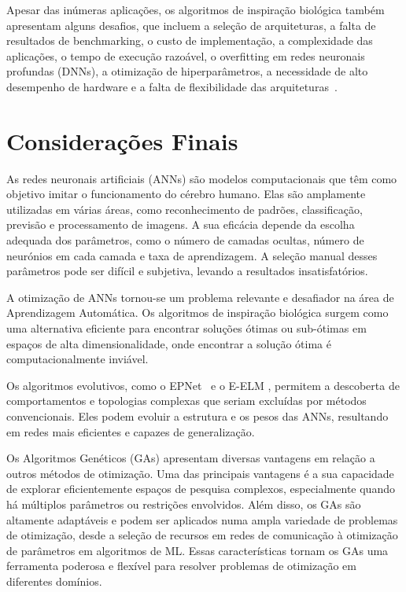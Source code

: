 \documentclass[conference]{IEEEtran}
\begin{document}
Apesar das inúmeras aplicações, os algoritmos de inspiração biológica também apresentam alguns desafios, que incluem a seleção de arquiteturas, a falta de resultados de benchmarking, o custo de implementação, a complexidade das aplicações, o tempo de execução razoável, o overfitting em redes neuronais profundas (DNNs), a otimização de hiperparâmetros, a necessidade de alto desempenho de hardware e a falta de flexibilidade das arquiteturas~\cite{Darwish2020ALearning, Mishra2023AAlgorithms}.

\section{Considerações Finais}

As redes neuronais artificiais (ANNs) são modelos computacionais que têm como objetivo imitar o funcionamento do cérebro humano. Elas são amplamente utilizadas em várias áreas, como reconhecimento de padrões, classificação, previsão e processamento de imagens. A sua eficácia depende da escolha adequada dos parâmetros, como o número de camadas ocultas, número de neurónios em cada camada e taxa de aprendizagem. A seleção manual desses parâmetros pode ser difícil e subjetiva, levando a resultados insatisfatórios.

A otimização de ANNs tornou-se um problema relevante e desafiador na área de Aprendizagem Automática. Os algoritmos de inspiração biológica surgem como uma alternativa eficiente para encontrar soluções ótimas ou sub-ótimas em espaços de alta dimensionalidade, onde encontrar a solução ótima é computacionalmente inviável.

Os algoritmos evolutivos, como o EPNet~\cite{Yao1997ANetworks} e o E-ELM \cite{Zhu2005EvolutionaryMachine}, permitem a descoberta de comportamentos e topologias complexas que seriam excluídas por métodos convencionais. Eles podem evoluir a estrutura e os pesos das ANNs, resultando em redes mais eficientes e capazes de generalização.

Os Algoritmos Genéticos (GAs) apresentam diversas vantagens em relação a outros métodos de otimização. Uma das principais vantagens é a sua capacidade de explorar eficientemente espaços de pesquisa complexos, especialmente quando há múltiplos parâmetros ou restrições envolvidos. Além disso, os GAs são altamente adaptáveis e podem ser aplicados numa ampla variedade de problemas de otimização, desde a seleção de recursos em redes de comunicação à otimização de parâmetros em algoritmos de ML. Essas características tornam os GAs uma ferramenta poderosa e flexível para resolver problemas de otimização em diferentes domínios.
\end{document}
